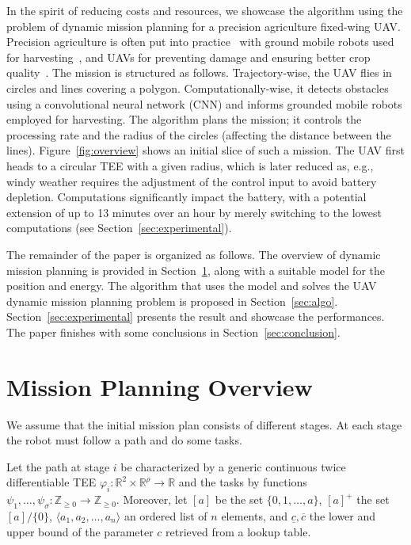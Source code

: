 \documentclass[letterpaper,10pt,conference]{ieeeconf}
\theoremstyle{definition}
\begin{document}
In the spirit of reducing costs and resources, we showcase the algorithm using the problem of dynamic mission planning for a precision agriculture fixed-wing UAV. Precision agriculture is often put into practice~\cite{hajjaj2014review} with ground mobile robots used for harvesting~\cite{qingchun2012study,dong2011development, de2011design, aljanobi2010setup, li2008analysis, edan2000robotic}, and UAVs for preventing damage and ensuring better crop quality~\cite{puri2017agriculture, daponte2019review}. The mission is structured as follows. Trajectory-wise, the UAV flies in circles and lines covering a polygon. Computationally-wise, it detects obstacles using a convolutional neural network (CNN) and informs grounded mobile robots employed for harvesting. The algorithm plans the mission; it controls the processing rate and the radius of the circles (affecting the distance between the lines). Figure~\ref{fig:overview} shows an initial slice of such a mission. The UAV first heads to a circular TEE with a given radius, which is later reduced as, e.g., windy weather requires the adjustment of the control input to avoid battery depletion. Computations significantly impact the battery, with a potential extension of up to 13 minutes over an hour by merely switching to the lowest computations (see Section~\ref{sec:experimental}).

The remainder of the paper is organized as follows. The overview of dynamic mission planning is provided in Section~\ref{sec:prob}, along with a suitable model for the position and energy. The algorithm that uses the model and solves the UAV dynamic mission planning problem is proposed in Section~\ref{sec:algo}. Section~\ref{sec:experimental} presents the result and showcase the performances. The paper finishes with some conclusions in Section~\ref{sec:conclusion}.


\section{Mission Planning Overview}
\label{sec:prob}

We assume that the initial mission plan consists of different stages. At each stage the robot must follow a path and do some tasks.

Let the path at stage $i$ be characterized by a generic continuous twice differentiable TEE $\varphi_i:\mathbb{R}^2\times\mathbb{R}^\rho\rightarrow\mathbb{R}$ and the tasks by functions $\psi_1,\dots,\psi_{\sigma}:\mathbb{Z}_{\geq 0}\rightarrow\mathbb{Z}_{\geq 0}$. Moreover, let $[a]$ be the set $\{0,1,\dots,a\}$, $[a]^+$ the set $[a]/\{0\}$, $\langle a_1,a_2,...,a_n\rangle$ an ordered list of $n$ elements, and $\underline{c},\overline{c}$ the lower and upper bound of the parameter $c$ retrieved from a lookup table.
\end{document}
